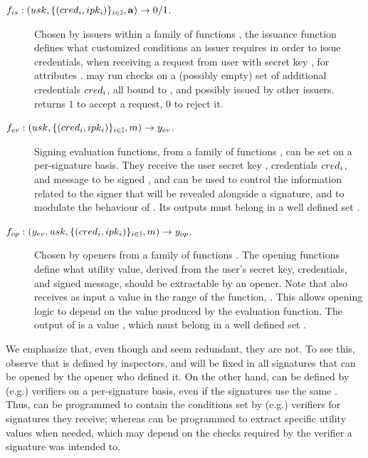 \begin{description}
\item[$f_{is}: (usk,\lbrace (cred_i,ipk_i) \rbrace_{i \in \mathbb{I}},\mathbf{a})
  \rightarrow 0/1$.] Chosen by issuers within a family of functions \famfissue,
  the issuance function defines what customized conditions an issuer requires
  in order to issue credentials, when receiving a request from user with secret
  key \usk, for attributes \attrs. \fissue may run checks on a (possibly empty)
  set of additional credentials $cred_i$, all bound to \usk, and possibly
  issued by other issuers. \fissue returns $1$ to accept a request, $0$ to
  reject it.
\item[$f_{ev}: (usk,\lbrace (cred_i,ipk_i) \rbrace_{i \in \mathbb{I}},m)
  \rightarrow y_{ev}$.] Signing evaluation functions, from a family of functions
  \famfeval, can be set on a per-signature basis. They receive the user secret
  key \usk, credentials $cred_i$, and message to be signed \msg, and can be
  used to control the information related to the signer that will be revealed
  alongside a signature, and to modulate the behaviour of \finsp. Its outputs
  \yeval must belong in a well defined set \rngfeval.
\item[$f_{op}: (y_{ev},usk,\lbrace (cred_i,ipk_i) \rbrace_{i \in \mathbb{I}},
  m) \rightarrow y_{op}$.]
  Chosen by openers from a family of functions \famfinsp. The opening
  functions define what utility value, derived from the user's secret key,
  credentials, and signed message, should be extractable by an opener.
  Note that \finsp also receives as input a value in the range of the \feval
  function, \rngfeval. This allows opening logic to depend on the value
  produced by the evaluation function. The output of \finsp is a value
  \yinsp, which must belong in a well defined set \rngfinsp.
\end{description}

We emphasize that, even though \finsp and \feval seem redundant, they are not.
To see this, observe that \finsp is defined by inspectors, and will be fixed in
all signatures that can be opened by the opener who defined it. On the other
hand, \feval can be defined by (e.g.) verifiers on a per-signature basis, even
if the signatures use the same \finsp. Thus, \feval can be programmed to contain
the conditions set by (e.g.) verifiers for signatures they receive; whereas
\finsp can be programmed to extract specific utility values when needed, which
may depend on the checks required by the verifier a signature was intended to.

